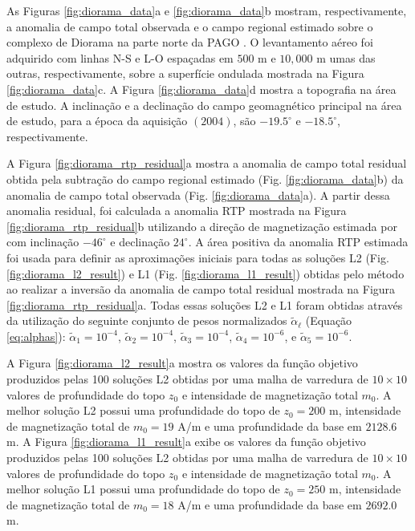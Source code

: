 As Figuras \ref{fig:diorama_data}a e \ref{fig:diorama_data}b mostram, respectivamente, 
a anomalia de campo total observada e o campo regional estimado sobre o complexo de Diorama na parte norte da PAGO \citep{junqueira_brod2005,
marangoni_mantovani2013, oliveirajr_etal2015}.
O levantamento aéreo foi adquirido com linhas N-S e L-O espaçadas em $500$ m e $10,000$ m umas das outras, respectivamente, sobre a superfície ondulada mostrada na Figura 
\ref{fig:diorama_data}c. 
A Figura \ref{fig:diorama_data}d mostra a topografia na área de estudo.
A inclinação e a declinação do campo geomagnético principal na área de estudo, para a época da aquisição $(2004)$, são $-19.5^{\circ}$ e 
$-18.5^{\circ}$, respectivamente.

A Figura \ref{fig:diorama_rtp_residual}a mostra a anomalia de campo total residual obtida pela subtração do campo regional estimado (Fig. \ref{fig:diorama_data}b)
da anomalia de campo total observada (Fig. \ref{fig:diorama_data}a).
A partir dessa anomalia residual, foi calculada a anomalia RTP mostrada na Figura \ref{fig:diorama_rtp_residual}b utilizando a direção de magnetização estimada por \citet{zhang-2018} com inclinação $-46^{\circ}$ e declinação $24^{\circ}$.
A área positiva da anomalia RTP estimada foi usada para definir as aproximações iniciais para todas as soluções L2 (Fig. \ref{fig:diorama_l2_result}) e L1 
(Fig. \ref{fig:diorama_l1_result}) obtidas pelo método ao realizar a inversão da anomalia de campo total residual mostrada na Figura \ref{fig:diorama_rtp_residual}a.
Todas essas soluções L2 e L1 foram obtidas através da utilização do seguinte conjunto de pesos normalizados $\tilde{\alpha}_{\ell}$ (Equação \ref{eq:alphas}):
$\tilde{\alpha}_{1} = 10^{-4}$, $\tilde{\alpha}_{2} = 10^{-4}$, 
$\tilde{\alpha}_{3} = 10^{-4}$, $\tilde{\alpha}_{4} = 10^{-6}$, e
$\tilde{\alpha}_{5} = 10^{-6}$.

A Figura \ref{fig:diorama_l2_result}a mostra os valores da função objetivo produzidos pelas 100 soluções L2 obtidas por uma malha de varredura de $10 \times 10$ valores de profundidade do topo $z_{0}$ e intensidade de magnetização total $m_{0}$.
A melhor solução L2 possui uma profundidade do topo de $z_{0} = 200$ m, intensidade de magnetização total de $m_{0} = 19$ A/m e uma profundidade da base em $2128.6$ m.
A Figura \ref{fig:diorama_l1_result}a exibe os valores da função objetivo produzidos pelas 100 soluções L2 obtidas por uma malha de varredura de $10 \times 10$ valores de profundidade do topo $z_{0}$ e intensidade de magnetização total $m_{0}$.
A melhor solução L1 possui uma profundidade do topo de $z_{0} = 250$ m, intensidade de magnetização total de $m_{0} = 18$ A/m e uma profundidade da base em $2692.0$ m.

